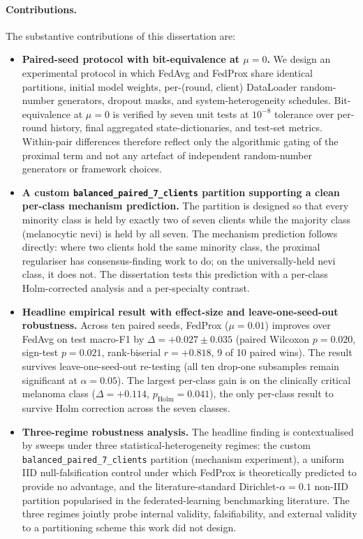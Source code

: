 \documentclass[11pt,a4paper]{article}
\begin{document}
\paragraph{Contributions.} The substantive contributions of this
dissertation are:
\begin{itemize}
\item \textbf{Paired-seed protocol with bit-equivalence at $\mu = 0$.}
We design an experimental protocol in which FedAvg and FedProx share
identical partitions, initial model weights, per-(round, client)
DataLoader random-number generators, dropout masks, and
system-heterogeneity schedules. Bit-equivalence at $\mu = 0$ is
verified by seven unit tests at $10^{-8}$ tolerance over per-round
history, final aggregated state-dictionaries, and test-set metrics.
Within-pair differences therefore reflect only the algorithmic gating
of the proximal term and not any artefact of independent random-number
generators or framework choices.

\item \textbf{A custom \texttt{balanced\_paired\_7\_clients} partition
supporting a clean per-class mechanism prediction.} The partition is
designed so that every minority class is held by exactly two of seven
clients while the majority class (melanocytic nevi) is held by all
seven. The mechanism prediction follows directly: where two clients
hold the same minority class, the proximal regulariser has
consensus-finding work to do; on the universally-held nevi class, it
does not. The dissertation tests this prediction with a per-class
Holm-corrected analysis and a per-specialty contrast.

\item \textbf{Headline empirical result with effect-size and
leave-one-seed-out robustness.} Across ten paired seeds, FedProx
($\mu = 0.01$) improves over FedAvg on test macro-F1 by
$\Delta = +0.027 \pm 0.035$ (paired Wilcoxon $p = 0.020$,
sign-test $p = 0.021$, rank-biserial $r = +0.818$, 9 of 10 paired
wins). The result survives leave-one-seed-out re-testing (all ten
drop-one subsamples remain significant at $\alpha = 0.05$). The
largest per-class gain is on the clinically critical melanoma class
($\Delta = +0.114$, $p_\text{Holm} = 0.041$), the only per-class
result to survive Holm correction across the seven classes.

\item \textbf{Three-regime robustness analysis.} The headline finding
is contextualised by sweeps under three statistical-heterogeneity
regimes: the custom \texttt{balanced\_paired\_7\_clients} partition
(mechanism experiment), a uniform IID null-falsification control
under which FedProx is theoretically predicted to provide no
advantage, and the literature-standard Dirichlet-$\alpha = 0.1$
non-IID partition popularised in the federated-learning benchmarking
literature. The three regimes jointly probe internal validity,
falsifiability, and external validity to a partitioning scheme this
work did not design.


\end{itemize}
\end{document}
